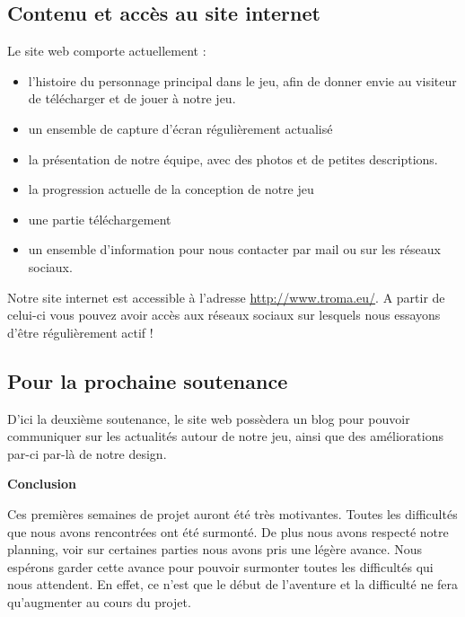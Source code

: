 \documentclass[11pt]{report}
\begin{document}
\subsection{Contenu et accès au site internet}

Le site web comporte actuellement :

\begin{itemize}
  \item l’histoire du personnage principal dans le jeu, afin de donner envie au visiteur de télécharger et de jouer à notre jeu.
  \item un ensemble de capture d'écran régulièrement actualisé
  \item la présentation de notre équipe, avec des photos et de petites descriptions.
  \item la progression actuelle de la conception de notre jeu
  \item une partie téléchargement
  \item un ensemble d'information pour nous contacter par mail ou sur les réseaux sociaux.
\end{itemize}

Notre site internet est accessible à l'adresse \url{http://www.troma.eu/}. A partir de celui-ci vous pouvez avoir accès aux réseaux sociaux sur lesquels nous essayons d'être régulièrement actif !

\subsection{Pour la prochaine soutenance}

D'ici la deuxième soutenance, le site web possèdera un blog pour pouvoir communiquer sur les actualités autour de notre jeu, ainsi que des améliorations par-ci par-là de notre design.

\newpage
\textbf{{\huge Conclusion}} \vspace{7mm}

Ces premières semaines de projet auront été très motivantes. Toutes les difficultés que nous avons rencontrées ont été surmonté. De plus nous avons respecté notre planning, voir sur certaines parties nous avons pris une légère avance. Nous espérons garder cette avance pour pouvoir surmonter toutes les difficultés qui nous attendent. En effet, ce n'est que le début de l'aventure et la difficulté ne fera qu'augmenter au cours du projet.
\end{document}
